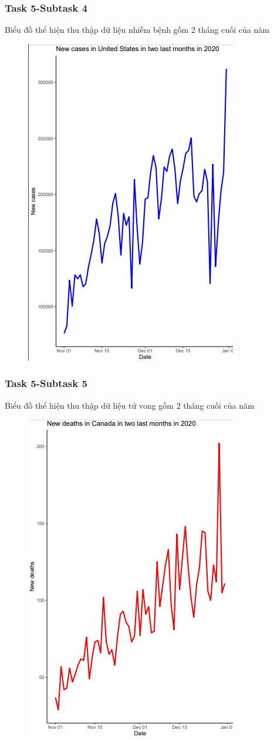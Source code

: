 \documentclass[english,10pt,table]{beamer}
\begin{document}
{
    \frametitle{Task 5-Subtask 4}
    \begin{block}{Biểu đồ thể hiện thu thập dữ liệu nhiễm bệnh gồm 2 tháng cuối của năm}
    \begin{figure}[H]
		\centering
		\includegraphics[scale=0.5]{images/5.4.3.png}
	\end{figure}
    \end{block}
}
\frame
{
    \frametitle{Task 5-Subtask 5}
    \begin{block}{Biểu đồ thể hiện thu thập dữ liệu tử vong gồm 2 tháng cuối của năm}
    \begin{figure}[H]
		\centering
		\includegraphics[scale=0.5]{images/5.5.1.png}
	\end{figure}
    \end{block}
}
\end{document}

